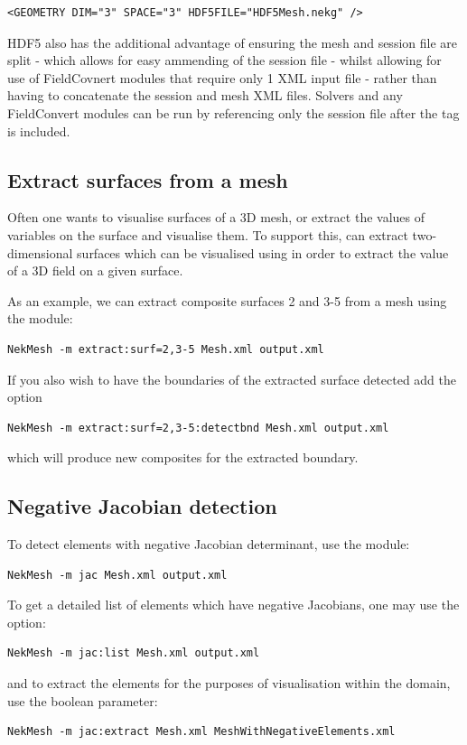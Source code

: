 \begin{lstlisting}[style=XmlStyle]
    <GEOMETRY DIM="3" SPACE="3" HDF5FILE="HDF5Mesh.nekg" />
\end{lstlisting}

HDF5 also has the additional advantage of ensuring the mesh and session file are split - which allows for easy ammending of the session file - whilst allowing for use of FieldCovnert modules that require only 1 XML input file - rather than having to concatenate the session and mesh XML files. Solvers and any FieldConvert modules can be run by referencing only the session file after the  tag is included. 

\subsection{Extract surfaces from a mesh}
\label{s:utilities:nekmesh:extract}

Often one wants to visualise surfaces of a 3D mesh, or extract the values of
variables on the surface and visualise them. To support this, \nm can extract
two-dimensional surfaces which can be visualised using  in
order to extract the value of a 3D field on a given surface.

As an example, we can extract composite surfaces 2 and 3-5 from a mesh using the
 module:
%
\begin{lstlisting}[style=BashInputStyle]
NekMesh -m extract:surf=2,3-5 Mesh.xml output.xml
\end{lstlisting}
%
If you also wish to have the boundaries of the extracted surface detected add
the  option
%
\begin{lstlisting}[style=BashInputStyle]
NekMesh -m extract:surf=2,3-5:detectbnd Mesh.xml output.xml
\end{lstlisting}
which will produce new composites for the extracted boundary.

\subsection{Negative Jacobian detection}

To detect elements with negative Jacobian determinant, use the 
module:
%
\begin{lstlisting}[style=BashInputStyle]
NekMesh -m jac Mesh.xml output.xml
\end{lstlisting}
%
To get a detailed list of elements which have negative Jacobians, one may use
the  option:
%
\begin{lstlisting}[style=BashInputStyle]
NekMesh -m jac:list Mesh.xml output.xml
\end{lstlisting}
%
and to extract the elements for the purposes of visualisation within the domain,
use the  boolean parameter:
%
\begin{lstlisting}[style=BashInputStyle]
NekMesh -m jac:extract Mesh.xml MeshWithNegativeElements.xml
\end{lstlisting}


